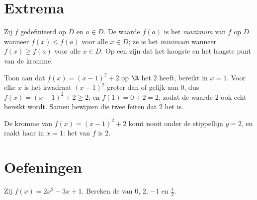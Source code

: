 \section{Extrema}

\begin{definition}\label{def:g10:functions:extrema}
Zij $f$ gedefinieerd op $D$ en $a \in D$. De waarde $f(a)$ is het
\emph{maximum} van $f$ op $D$ wanneer $f(x) \leq f(a)$ voor
alle $x \in D$; ze is het \emph{minimum} wanneer
$f(x) \geq f(a)$ voor alle $x \in D$. Op een  zijn dat het hoogste en
het laagste punt van de kromme.
\end{definition}

\begin{example}\label{ex:g10:functions:extremum}
Toon aan dat $f(x) = (x - 1)^2 + 2$ op $\R$ het  $2$ heeft, bereikt in
$x = 1$. Voor elke $x$ is het kwadraat $(x-1)^2$ groter dan of gelijk aan
$0$, dus $f(x) = (x-1)^2 + 2 \geq 2$; en $f(1) = 0 + 2 = 2$, zodat de waarde
$2$ ook echt bereikt wordt. Samen bewijzen die twee feiten dat $2$ het
 is.
\end{example}

\begin{omfigure}

{\small De kromme van $f(x) = (x-1)^2 + 2$ komt nooit onder de stippellijn
$y = 2$, en raakt haar in $x = 1$: het  van $f$ is $2$.}
\end{omfigure}

\section{Oefeningen}

\begin{exercise}[$\star$]\label{exo:g10:functions:1}
Zij $f(x) = 2x^2 - 3x + 1$. Bereken de  van $0$, $2$, $-1$ en
$\frac12$.
\end{exercise}

